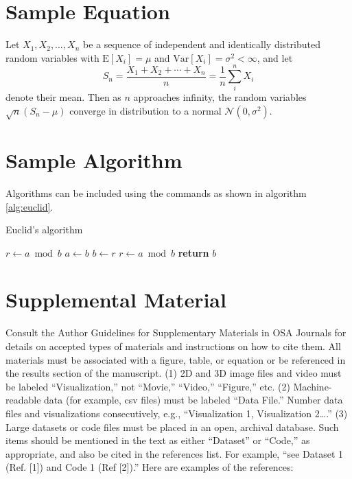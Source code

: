 \documentclass[9pt,twocolumn,twoside]{osajnl}
\begin{document}
\section{Sample Equation}

Let $X_1, X_2, \ldots, X_n$ be a sequence of independent and identically distributed random variables with $\text{E}[X_i] = \mu$ and $\text{Var}[X_i] = \sigma^2 < \infty$, and let
\begin{equation}
S_n = \frac{X_1 + X_2 + \cdots + X_n}{n}
      = \frac{1}{n}\sum_{i}^{n} X_i
\label{eq:refname1}
\end{equation}
denote their mean. Then as $n$ approaches infinity, the random variables $\sqrt{n}(S_n - \mu)$ converge in distribution to a normal $\mathcal{N}(0, \sigma^2)$.

\section{Sample Algorithm}

Algorithms can be included using the commands as shown in algorithm \ref{alg:euclid}.

\begin{algorithm}
\caption{Euclid’s algorithm}\label{alg:euclid}
\begin{algorithmic}[1]
\State $r\gets a\bmod b$
\State $a\gets b$
\State $b\gets r$
\State $r\gets a\bmod b$
\EndWhile\label{euclidendwhile}
\State \textbf{return} $b$
\EndProcedure
\end{algorithmic}
\end{algorithm}

\section{Supplemental Material}

Consult the Author Guidelines for Supplementary Materials in OSA Journals for details on accepted types of materials and instructions on how to cite them.
All materials must be associated with a figure, table, or equation or be referenced in the results section of the manuscript.
(1) 2D and 3D image files and video must be labeled “Visualization,” not “Movie,” “Video,” “Figure,” etc.
(2) Machine-readable data (for example, csv files) must be labeled  “Data File.”  Number data files and visualizations consecutively, e.g., “Visualization 1, Visualization 2….”
(3) Large datasets or code files must be placed in an open, archival database.  Such items should be mentioned in the text as either “Dataset” or “Code,” as appropriate, and also be cited in the references list.  For example, “see Dataset 1 (Ref. [1]) and Code 1 (Ref [2]).” Here are examples of the references:
\end{document}
